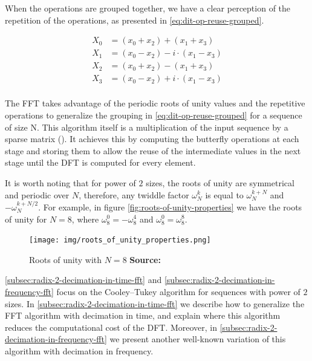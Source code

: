 \documentclass[
  oneside,
  11pt, a4paper,
  footinclude=true,
  headinclude=true,
  cleardoublepage=empty
]{scrbook}
\newcommand*{\source}[1]{%
    \textbf{Source:} \cite{#1}%
}
\begin{document}
When the operations are grouped together, we have a clear perception of the repetition of the operations, as presented in \autoref{eq:dit-op-reuse-grouped}.

\begin{equation} \label{eq:dit-op-reuse-grouped}
    \begin{split}
    X_{0} &= (x_{0} + x_{2}) + (x_{1} + x_{3}) \\
    X_{1} &= (x_{0} - x_{2}) - i \cdot (x_{1} - x_{3}) \\
    X_{2} &= (x_{0} + x_{2}) - (x_{1} + x_{3}) \\
    X_{3} &= (x_{0} - x_{2}) + i \cdot (x_{1} - x_{3}) \\
    \end{split}
\end{equation}

The FFT takes advantage of the periodic roots of unity values and the repetitive operations to generalize the grouping in \autoref{eq:dit-op-reuse-grouped} for a sequence of size N. This algorithm itself is a multiplication of the input sequence by a sparse matrix (\cite{heckbert1995fourier}). It achieves this by computing the butterfly operations at each stage and storing them to allow the reuse of the intermediate values in the next stage until the DFT is computed for every element.
 \newline


It is worth noting that for power of $2$ sizes, the roots of unity are symmetrical and periodic over $N$, therefore, any twiddle factor $\omega^{k}_{N}$ is equal to $\omega^{k+N}_{N}$ and $-\omega^{k+N/2}_{N}$. For example, in figure \autoref{fig:roots-of-unity-properties} we have the roots of unity for $N = 8$, where $\omega^{0}_{8} = -\omega^{4}_{8}$ and $\omega^{0}_{8} = \omega^{8}_{8}$.

\begin{figure}[h] 
    \centering
    \texttt{[image: img/roots\_of\_unity\_properties.png]}
    \caption{Roots of unity with $N = 8$ \source{heckbert1995fourier}}
    \label{fig:roots-of-unity-properties}
\end{figure}


\autoref{subsec:radix-2-decimation-in-time-fft} and \autoref{subsec:radix-2-decimation-in-frequency-fft} focus on the Cooley–Tukey algorithm for sequences with power of $2$ sizes. In \autoref{subsec:radix-2-decimation-in-time-fft} we describe how to generalize the FFT algorithm with decimation in time, and explain where this algorithm reduces the computational cost of the DFT. Moreover, in \autoref{subsec:radix-2-decimation-in-frequency-fft} we present another well-known variation of this algorithm with decimation in frequency.
\end{document}
